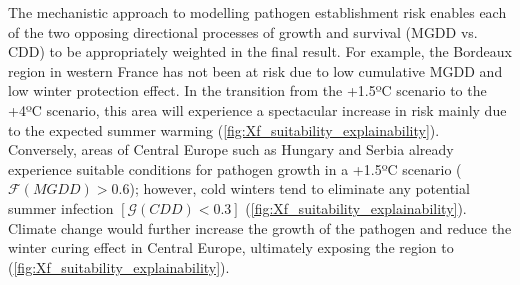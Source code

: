 The mechanistic approach to modelling pathogen establishment risk enables
each of the two opposing directional processes of growth and survival (MGDD vs.
CDD) to be appropriately weighted in the final result. For example, the
Bordeaux region in western France has not been at risk due to low cumulative
MGDD and low winter protection effect.	In the transition from the +1.5ºC
scenario to the +4ºC scenario, this area will experience a spectacular increase
in risk mainly due to the expected summer warming
(\cref{fig:Xf_suitability_explainability}). Conversely, areas of Central
Europe such as Hungary and Serbia already experience suitable conditions for
pathogen growth in a +1.5ºC scenario ($\mathcal{F}(MGDD) > 0.6$); however, cold
winters tend to eliminate any potential summer infection $[\mathcal{G}(CDD) <
            0.3]$ (\cref{fig:Xf_suitability_explainability}). Climate change
would further
increase the growth of the pathogen  and reduce the winter curing effect in
Central Europe, ultimately exposing the region to \xf{}
(\cref{fig:Xf_suitability_explainability}).

